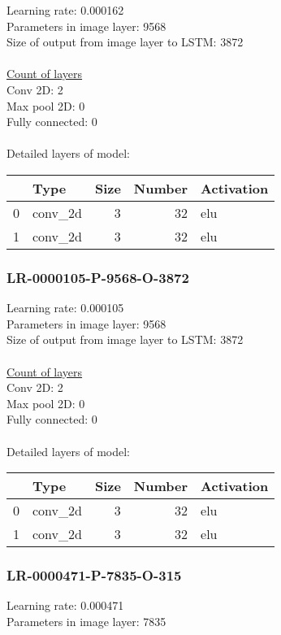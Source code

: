 Learning rate: 0.000162
\\Parameters in image layer: 9568
\\Size of output from image layer to LSTM: 3872
\\\\\underline{Count of layers} 
\\Conv 2D:           2\\Max pool 2D:      0\\Fully connected:  0
\\\\Detailed layers of model: \\\begin{tabular}{rlrrl}
\hline
    & Type    &   Size &   Number & Activation   \\
\hline
  0 & conv\_2d &      3 &       32 & elu          \\
  1 & conv\_2d &      3 &       32 & elu          \\
\hline
\end{tabular}\subsubsection*{LR-0000105-P-9568-O-3872}
Learning rate: 0.000105
\\Parameters in image layer: 9568
\\Size of output from image layer to LSTM: 3872
\\\\\underline{Count of layers} 
\\Conv 2D:           2\\Max pool 2D:      0\\Fully connected:  0
\\\\Detailed layers of model: \\\begin{tabular}{rlrrl}
\hline
    & Type    &   Size &   Number & Activation   \\
\hline
  0 & conv\_2d &      3 &       32 & elu          \\
  1 & conv\_2d &      3 &       32 & elu          \\
\hline
\end{tabular}\subsubsection*{LR-0000471-P-7835-O-315}
Learning rate: 0.000471
\\Parameters in image layer: 7835
